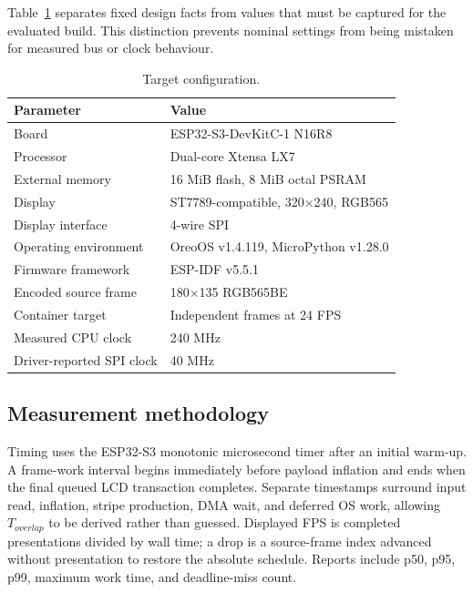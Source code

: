 \documentclass[11pt,twocolumn]{article}
\begin{document}
Table~\ref{tab:platform} separates fixed design facts from values that must be
captured for the evaluated build.  This distinction prevents nominal settings
from being mistaken for measured bus or clock behaviour.

\begin{table}[h]
\centering
\caption{Target configuration.}
\label{tab:platform}
\begin{tabular}{@{}p{}p{}@{}}
\toprule
Parameter & Value \\
\midrule
Board & ESP32-S3-DevKitC-1 N16R8 \\
Processor & Dual-core Xtensa LX7 \\
External memory & 16 MiB flash, 8 MiB octal PSRAM \\
Display & ST7789-compatible, 320$\times$240, RGB565 \\
Display interface & 4-wire SPI \\
Operating environment & OreoOS v1.4.119, MicroPython v1.28.0 \\
Firmware framework & ESP-IDF v5.5.1 \\
Encoded source frame & 180$\times$135 RGB565BE \\
Container target & Independent frames at 24 FPS \\
Measured CPU clock & 240 MHz \\
Driver-reported SPI clock & 40 MHz \\
\bottomrule
\end{tabular}
\end{table}

\begin{table}[!t]
\centering
\caption{Measured standalone RV565 v6 performance over ten runs.}
\label{tab:results}
\end{table}

\subsection{Measurement methodology}

Timing uses the ESP32-S3 monotonic microsecond timer after an initial warm-up.
A frame-work interval begins immediately before payload inflation and ends
when the final queued LCD transaction completes.  Separate timestamps surround
input read, inflation, stripe production, DMA wait, and deferred OS work,
allowing $T_{overlap}$ to be derived rather than guessed.  Displayed FPS is
completed presentations divided by wall time; a drop is a source-frame index
advanced without presentation to restore the absolute schedule.  Reports
include p50, p95, p99, maximum work time, and deadline-miss count.
\end{document}
